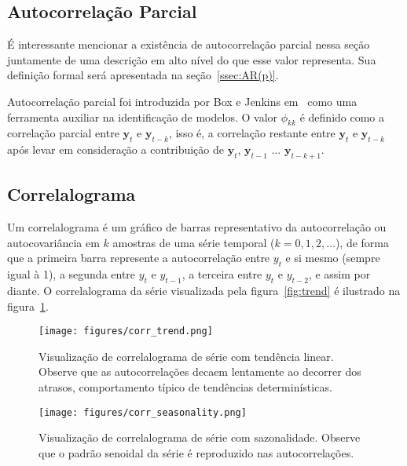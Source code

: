 \vspace{1cm}

\subsection{Autocorrelação Parcial}\label{ssec:partial_acorr}

É interessante mencionar a existência de autocorrelação parcial nessa seção
juntamente de uma descrição em alto nível do que esse valor representa. Sua
definição formal será apresentada na seção~\ref{ssec:AR(p)}.

Autocorrelação parcial foi introduzida por Box e Jenkins em~\cite{box} como uma
ferramenta auxiliar na identificação de modelos. O valor $\phi_{kk}$ é
definido como a correlação parcial entre $\mathbf{y}_t$ e $\mathbf{y}_{t - k}$,
isso é, a correlação restante entre $\mathbf{y}_t$ e $\mathbf{y}_{t - k}$ após
levar em consideração a contribuição de $\mathbf{y}_t$, $\mathbf{y}_{t - 1}$
$...$ $\mathbf{y}_{t - k + 1}$.

\subsection{Correlalograma}\label{ssec:correlalogram}

Um correlalograma é um gráfico de barras representativo da autocorrelação ou
autocovariância em $k$ amostras de uma série temporal ($k=0, 1, 2, \dots$), de
forma que a primeira barra represente a autocorrelação entre $y_t$ e si mesmo
(sempre igual à 1), a segunda entre $y_t$ e $y_{t-1}$, a terceira entre $y_t$ e
$y_{t-2}$, e assim por diante. O correlalograma da série visualizada pela
figura~\ref{fig:trend} é ilustrado na figura~\ref{fig:correlalogram}.

\begin{figure}
    \centering
    \texttt{[image: figures/corr\_trend.png]}
    \caption{Visualização de correlalograma de série com tendência linear.
    Observe que as autocorrelações decaem lentamente ao decorrer dos atrasos,
    comportamento típico de tendências determinísticas.}
    \label{fig:correlalogram}
\end{figure}

\begin{figure}
    \centering
    \texttt{[image: figures/corr\_seasonality.png]}
    \caption{Visualização de correlalograma de série com sazonalidade.
    Observe que o padrão senoidal da série é reproduzido nas autocorrelações.}
    \label{fig:corr_season}
\end{figure}

